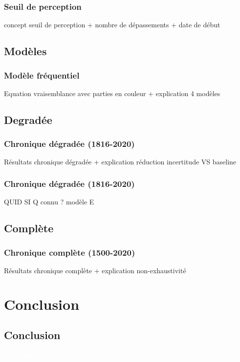 \documentclass[compress,9pt]{beamer}
\begin{document}
    \begin{frame}
    		\frametitle{Seuil de perception}
    		concept seuil de perception + nombre de dépassements + date de début \cite{stedinger_flood_1986}
	\end{frame}
	
    \subsection{Modèles}
    \begin{frame}
    		\frametitle{Modèle fréquentiel}
    		Equation vraisemblance avec parties en couleur + explication 4 modèles
	\end{frame}
	
	\subsection{Degradée}
    \begin{frame}
    		\frametitle{Chronique dégradée (1816-2020)}
    		Résultats chronique dégradée + explication réduction incertitude VS baseline
	\end{frame}
	
    \begin{frame}
    		\frametitle{Chronique dégradée (1816-2020)}
    		QUID SI Q connu ? modèle E
	\end{frame}
	\subsection{Complète}
    \begin{frame}
    		\frametitle{Chronique complète (1500-2020)}
    		Résultats chronique complète + explication non-exhaustivité
	\end{frame}
    
\section{Conclusion}
	\subsection{Conclusion}
	{
    \begin{frame}
        \begin{center}
				\textcolor{white}{\Large \textbf{Conclusion}}\\
		 		\vspace{0.3cm}
        \end{center}
    \end{frame}
    }
    
\end{document}
